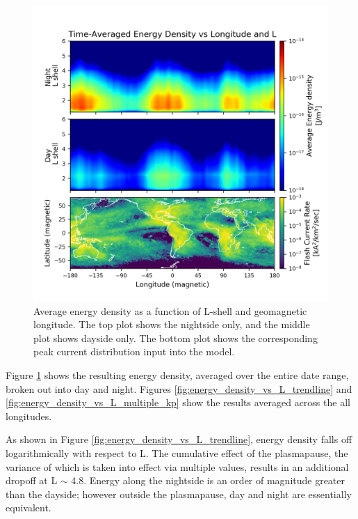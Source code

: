 \begin{figure}
\begin{center}
\includegraphics{figures/Energy_density_daynite.png}
\caption[Average energy density vs longitude and L]{Average energy density as a function of L-shell and geomagnetic longitude. The top plot shows the nightside only, and the middle plot shows dayside only. The bottom plot shows the corresponding peak current distribution input into the model.}
\label{fig:energy_density_daynite}
\end{center}
\end{figure}

Figure \ref{fig:energy_density_daynite} shows the resulting energy density, averaged over the entire date range, broken out into day and night. Figures \ref{fig:energy_density_vs_L_trendline} and \ref{fig:energy_density_vs_L_multiple_kp} show the results averaged across the all longitudes.

As shown in Figure \ref{fig:energy_density_vs_L_trendline}, energy density falls off logarithmically with respect to L. The cumulative effect of the plasmapause, the variance of which is taken into effect via multiple \kp{} values, results in an additional dropoff at L $\sim$ 4.8. Energy along the nightside is an order of magnitude greater than the dayside; however outside the plasmapause, day and night are essentially equivalent.

